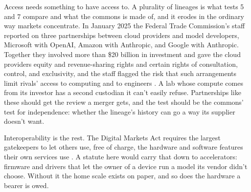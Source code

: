 Access needs something to have access to. A plurality of lineages is what tests 5 and 7 compare and what the commons is made of, and it erodes in the ordinary way markets concentrate. In January 2025 the Federal Trade Commission's staff reported on three partnerships between cloud providers and model developers, Microsoft with OpenAI, Amazon with Anthropic, and Google with Anthropic. Together they involved more than \$20 billion in investment and gave the cloud providers equity and revenue-sharing rights and certain rights of consultation, control, and exclusivity, and the staff flagged the risk that such arrangements limit rivals' access to computing and to engineers \autocite{ftc2025partnerships}. A lab whose compute comes from its investor has a second custodian it can't easily refuse. Partnerships like these should get the review a merger gets, and the test should be the commons' test for independence: whether the lineage's history can go a way its supplier doesn't want.

Interoperability is the rest. The Digital Markets Act requires the largest gatekeepers to let others use, free of charge, the hardware and software features their own services use \autocite{eu2022dma}. A statute here would carry that down to accelerators: firmware and drivers that let the owner of a device run a model its vendor didn't choose. Without it the home scale exists on paper, and so does the hardware a bearer is owed.
